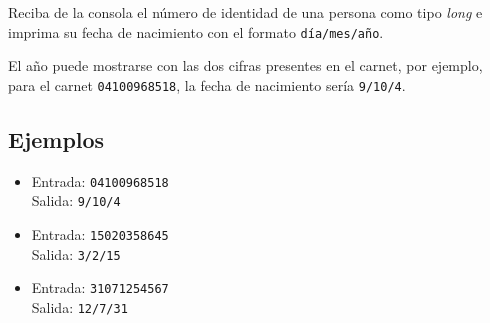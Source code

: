 Reciba de la consola el número de identidad de una persona como tipo \textit{long} e imprima su fecha de nacimiento con el formato  \texttt{día/mes/año}.

El año puede mostrarse con las dos cifras presentes en el carnet, por ejemplo, para el carnet \texttt{04100968518}, la fecha de nacimiento sería \texttt{9/10/4}.

\subsection*{Ejemplos}
\begin{itemize}
    \item Entrada: \texttt{04100968518}\\
          Salida: \texttt{9/10/4}
    \item Entrada: \texttt{15020358645}\\
          Salida: \texttt{3/2/15}
    \item Entrada: \texttt{31071254567}\\
          Salida: \texttt{12/7/31}
\end{itemize}